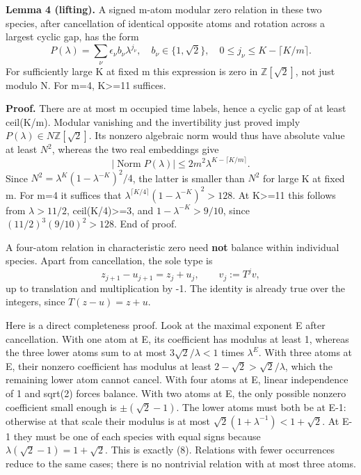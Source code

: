 \documentclass[11pt,a4paper]{article}
\begin{document}
\textbf{Lemma 4 (lifting).} A signed m-atom modular zero relation in these two species, after cancellation of identical opposite atoms and rotation across a largest cyclic gap, has the form \[
 P(\lambda)=\sum_\nu \epsilon_\nu b_\nu\lambda^{j_\nu},
 \quad b_\nu\in\{1,\sqrt2\},\quad
 0\leq j_\nu\leq K-\lceil K/m\rceil.
\] For sufficiently large K at fixed m this expression is zero in \(\mathbb Z[\sqrt2]\), not just modulo N. For m=4, K\textgreater=11 suffices.

\textbf{Proof.} There are at most m occupied time labels, hence a cyclic gap of at least ceil(K/m). Modular vanishing and the invertibility just proved imply \(P(\lambda)\in N\mathbb Z[\sqrt2]\). Its nonzero algebraic norm would thus have absolute value at least \(N^2\), whereas the two real embeddings give \[
 |\operatorname{Norm}P(\lambda)|
 \leq2m^2\lambda^{K-\lceil K/m\rceil}.
\] Since \(N^2=\lambda^K(1-\lambda^{-K})^2/4\), the latter is smaller than \(N^2\) for large K at fixed m. For m=4 it suffices that \(\lambda^{\lceil K/4\rceil}(1-\lambda^{-K})^2>128\). At K\textgreater=11 this follows from \(\lambda>11/2\), ceil(K/4)\textgreater=3, and \(1-\lambda^{-K}>9/10\), since \((11/2)^3(9/10)^2>128\). End of proof.

A four-atom relation in characteristic zero need \textbf{not} balance within individual species. Apart from cancellation, the sole type is \[
 z_{j+1}-u_{j+1}=z_j+u_j,\qquad v_j:=T^jv,                     \tag{8}
\] up to translation and multiplication by -1. The identity is already true over the integers, since \(T(z-u)=z+u\).

Here is a direct completeness proof. Look at the maximal exponent E after cancellation. With one atom at E, its coefficient has modulus at least 1, whereas the three lower atoms sum to at most \(3\sqrt2/\lambda<1\) times \(\lambda^E\). With three atoms at E, their nonzero coefficient has modulus at least \(2-\sqrt2>\sqrt2/\lambda\), which the remaining lower atom cannot cancel. With four atoms at E, linear independence of 1 and sqrt(2) forces balance. With two atoms at E, the only possible nonzero coefficient small enough is \(\pm(\sqrt2-1)\). The lower atoms must both be at E-1: otherwise at that scale their modulus is at most \(\sqrt2(1+\lambda^{-1})<1+\sqrt2\). At E-1 they must be one of each species with equal signs because \(\lambda(\sqrt2-1)=1+\sqrt2\). This is exactly (8). Relations with fewer occurrences reduce to the same cases; there is no nontrivial relation with at most three atoms.
\end{document}
